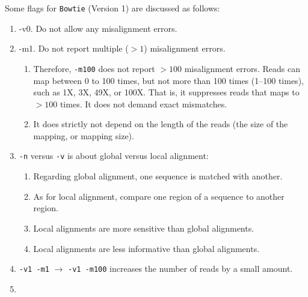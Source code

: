 Some flags for {\tt Bowtie} (Version 1) are discussed as follows: \vspace{-0.3cm}
\begin{enumerate} \itemsep -4pt
\item -v0. Do not allow any misalignment errors.
\item -m1. Do not report multiple ($> 1$) misalignment errors. \vspace{-0.3cm}
	\begin{enumerate} \itemsep -2pt
	\item Therefore, {\tt -m100} does not report $> 100$ misalignment errors. Reads can map between 0 to 100 times, but not more than 100 times (1--100 times), such as 1X, 3X, 49X, or 100X. That is, it suppresses reads that maps to $> 100$ times. It does not demand exact mismatches.
	\item It does strictly not depend on the length of the reads (the size of the mapping, or mapping size).
	\end{enumerate}
\item {\tt -n} versus {\tt -v} is about global versus local alignment: \vspace{-0.3cm}
	\begin{enumerate} \itemsep -2pt
	\item Regarding global alignment, one sequence is matched with another.
	\item As for local alignment, compare one region of a sequence to another region.
	\item Local alignments are more sensitive than global alignments.
	\item Local alignments are less informative than global alignments.
	\end{enumerate}
\item {\tt -v1 -m1} $\rightarrow$ {\tt -v1 -m100} increases the number of reads by a small amount.
\item 
\end{enumerate}

